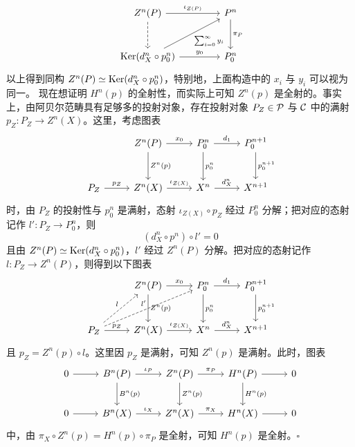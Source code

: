 \[\begin{tikzcd}[row sep=2.8em, column sep=4.2em]
Z^n(P) \arrow[r,"\iota_{Z(P)}"] \arrow[d,dashed] & P^n \arrow[d,"\pi_P"]\\
\Ker(d_X^n\circ p_0^n) \arrow[r,"y_0"] \arrow[ur,"\sum_{i=0}^{\infty}y_i"'] & P_0^n
\end{tikzcd}\]
以上得到同构 $Z^n(P)\simeq\operatorname{Ker}(d_X^n\circ p_0^n)$，特别地，上面构造中的 $x_i$ 与 $y_i$ 可以视为同一。
现在想证明 $H^n(p)$ 的全射性，而实际上可知 $Z^n(p)$ 是全射的。事实上，由阿贝尔范畴具有足够多的投射对象，存在投射对象 $P_Z\in\mathcal{P}$ 与 $\mathcal{C}$ 中的满射 $p_Z\colon P_Z\to Z^n(X)$。这里，考虑图表
\[\begin{tikzcd}[row sep=2.8em, column sep=2.6em]
 & Z^n(P) \arrow[r,"x_0"] \arrow[d,"Z^n(p)"] & P_0^n \arrow[r,"d_1"] \arrow[d,"p_0^n"] & P_0^{n+1} \arrow[d,"p_0^{n+1}"]\\
P_Z \arrow[r,"p_Z"] & Z^n(X) \arrow[r,"\iota_{Z(X)}"] & X^n \arrow[r,"d_X^n"] & X^{n+1}
\end{tikzcd}\]
时，由 $P_Z$ 的投射性与 $p_0^n$ 是满射，态射 $\iota_{Z(X)}\circ p_Z$ 经过 $P_0^n$ 分解；把对应的态射记作 $l'\colon P_Z\to P_0^n$，则
\[
  (d_X^n\circ p^n)\circ l'=0
\]
且由 $Z^n(P)\simeq\operatorname{Ker}(d_X^n\circ p_0^n)$，$l'$ 经过 $Z^n(P)$ 分解。把对应的态射记作 $l\colon P_Z\to Z^n(P)$，则得到以下图表
\[\begin{tikzcd}[row sep=2.8em, column sep=2.6em]
 & Z^n(P) \arrow[r,"x_0"] \arrow[d,"Z^n(p)"] & P_0^n \arrow[r,"d_1"] \arrow[d,"p_0^n"] & P_0^{n+1} \arrow[d,"p_0^{n+1}"]\\
P_Z \arrow[r,"p_Z"] \arrow[ur,dashed,"l"] \arrow[urr,dashed,"l'"] & Z^n(X) \arrow[r,"\iota_{Z(X)}"] & X^n \arrow[r,"d_X^n"] & X^{n+1}
\end{tikzcd}\]
且 $p_Z=Z^n(p)\circ l$。这里因 $p_Z$ 是满射，可知 $Z^n(p)$ 是满射。此时，图表
\[\begin{tikzcd}[row sep=2.4em, column sep=2.6em]
0 \arrow[r] & B^n(P) \arrow[r,"\iota_P"] \arrow[d,"B^n(p)"] & Z^n(P) \arrow[r,"\pi_P"] \arrow[d,"Z^n(p)"] & H^n(P) \arrow[r] \arrow[d,"H^n(p)"] & 0\\
0 \arrow[r] & B^n(X) \arrow[r,"\iota_X"] & Z^n(X) \arrow[r,"\pi_X"] & H^n(X) \arrow[r] & 0
\end{tikzcd}\]
中，由 $\pi_X\circ Z^n(p)=H^n(p)\circ\pi_P$ 是全射，可知 $H^n(p)$ 是全射。\hfill$\square$



